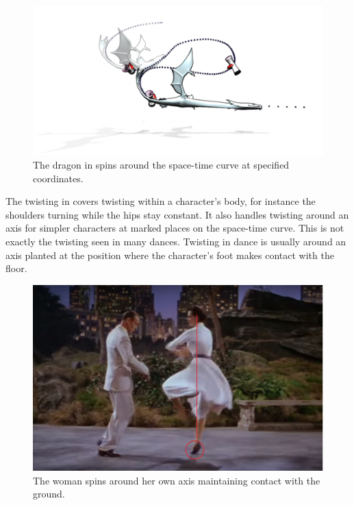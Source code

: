\begin{figure}[!h]
\centering
\includegraphics[scale=0.5]{img/twisting}
\caption{The dragon in \citep{guay2015space} spins around the space-time curve at specified coordinates.}
\end{figure}

The twisting in \citep{guay2015space} covers twisting within a character's body, for instance the shoulders turning while the hips stay constant. It also handles twisting around an axis for simpler characters at marked places on the space-time curve. This is not exactly the twisting seen in many dances. Twisting in dance is usually around an axis planted at the position where the character's foot makes contact with the floor.


\begin{figure}[!h]
\centering
\includegraphics[scale=0.5]{img/twistinghuman}
\caption{The woman spins around her own axis maintaining contact with the ground.}
\end{figure}


